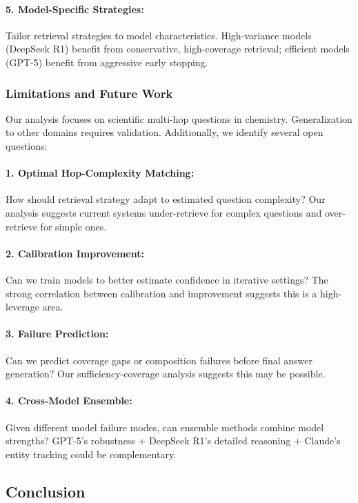 \paragraph{5. Model-Specific Strategies:} Tailor retrieval strategies to model characteristics. High-variance models (DeepSeek R1) benefit from conservative, high-coverage retrieval; efficient models (GPT-5) benefit from aggressive early stopping.

\subsubsection{Limitations and Future Work}

Our analysis focuses on scientific multi-hop questions in chemistry. Generalization to other domains requires validation. Additionally, we identify several open questions:

\paragraph{1. Optimal Hop-Complexity Matching:} How should retrieval strategy adapt to estimated question complexity? Our analysis suggests current systems under-retrieve for complex questions and over-retrieve for simple ones.

\paragraph{2. Calibration Improvement:} Can we train models to better estimate confidence in iterative settings? The strong correlation between calibration and improvement suggests this is a high-leverage area.

\paragraph{3. Failure Prediction:} Can we predict coverage gaps or composition failures before final answer generation? Our sufficiency-coverage analysis suggests this may be possible.

\paragraph{4. Cross-Model Ensemble:} Given different model failure modes, can ensemble methods combine model strengths? GPT-5's robustness + DeepSeek R1's detailed reasoning + Claude's entity tracking could be complementary.

\subsection{Conclusion}

